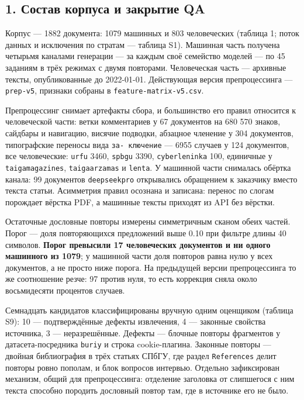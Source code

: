 \documentclass[11pt,a4paper]{article}
\renewcommand{\_}{\textunderscore\allowbreak}
\begin{document}
\subsection{1. Состав корпуса и закрытие QA}

Корпус — 1882 документа: 1079 машинных и 803 человеческих (таблица 1; поток
данных и исключения по стратам — таблица S1). Машинная часть
получена четырьмя каналами генерации — за каждым своё семейство моделей — по 45 заданиям в трёх режимах с двумя
повторами. Человеческая часть — архивные тексты, опубликованные до 2022-01-01.
Действующая версия препроцессинга — \texttt{prep-\allowbreak{}v5}, признаки собраны в
\texttt{feature-\allowbreak{}matrix-\allowbreak{}v5.csv}.

Препроцессинг снимает артефакты сбора, и большинство его правил относится к
человеческой части: ветки комментариев у 67 документов на 680 570 знаков,
сайдбары и навигацию, висячие подводки, абзацное членение у 304 документов,
типографские переносы вида \texttt{за-\allowbreak{} ключение} — 6955 случаев у 124 документов, все
человеческие: \texttt{urfu} 3460, \texttt{spbgu} 3390, \texttt{cyberleninka} 100, единичные у
\texttt{taiga\_magazines}, \texttt{taiga\_arzamas} и \texttt{lenta}. У машинной части снималась обёртка
канала: 99 документов \texttt{deepseek\_pro} открывались обращением к заказчику вместо
текста статьи.
Асимметрия правил осознана и записана: перенос по слогам порождает вёрстка PDF, а
машинные тексты приходят из API без вёрстки.

Остаточные дословные повторы измерены симметричным сканом обеих частей. Порог —
доля повторяющихся предложений выше 0.10 при фильтре длины 40 символов. \textbf{Порог
превысили 17 человеческих документов и ни одного машинного из 1079}; у машинной
части доля повторов равна нулю у всех документов, а не просто ниже порога. На
предыдущей версии препроцессинга то же соотношение резче: 97 против нуля, то есть
коррекция сняла около восьмидесяти процентов случаев.

Семнадцать кандидатов классифицированы вручную одним оценщиком (таблица S9): 10 —
подтверждённые дефекты извлечения, 4 — законные свойства источника, 3 —
неразрешённые. Дефекты — блочные повторы фрагментов у датасета-посредника
\texttt{buriy\_2014} и строка cookie-плагина. Законные повторы — двойная библиография в
трёх статьях СПбГУ, где раздел \texttt{References} делит повторы ровно пополам, и блок
вопросов интервью. Отдельно зафиксирован механизм, общий для препроцессинга:
отделение заголовка от слипшегося с ним текста способно породить дословный повтор
там, где в источнике его не было.
\end{document}
